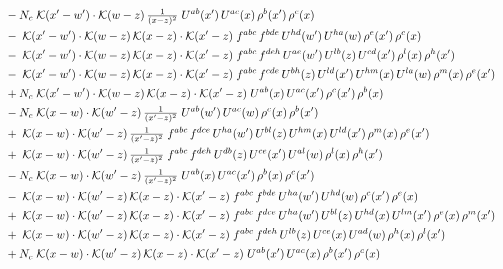 \documentclass[10pt]{article}
\numberwithin{equation}{section}
\begin{document}
\begin{align}
&\quad -N_c\;\mathcal{K}(x'-w')\cdot\mathcal{K}(w-z)\,\tfrac{1}{(x-z)^{2}}\;U^{ab}(x')\,U^{ac}(x)\,\rho^{b}(x')\,\rho^{c}(x)\notag\\
&\quad -\;\mathcal{K}(x'-w')\cdot\mathcal{K}(w-z)\,\mathcal{K}(x-z)\cdot\mathcal{K}(x'-z)\;f^{abc}\,f^{bde}\,U^{hd}(w')\,U^{ha}(w)\,\rho^{e}(x')\,\rho^{c}(x)\notag\\
&\quad -\;\mathcal{K}(x'-w')\cdot\mathcal{K}(w-z)\,\mathcal{K}(x-z)\cdot\mathcal{K}(x'-z)\;f^{abc}\,f^{deh}\,U^{ae}(w')\,U^{lb}(z)\,U^{cd}(x')\,\rho^{l}(x)\,\rho^{h}(x')\notag\\
&\quad -\;\mathcal{K}(x'-w')\cdot\mathcal{K}(w-z)\,\mathcal{K}(x-z)\cdot\mathcal{K}(x'-z)\;f^{abc}\,f^{cde}\,U^{bh}(z)\,U^{ld}(x')\,U^{hm}(x)\,U^{la}(w)\,\rho^{m}(x)\,\rho^{e}(x')\notag\\
&\quad +N_c\;\mathcal{K}(x'-w')\cdot\mathcal{K}(w-z)\,\mathcal{K}(x-z)\cdot\mathcal{K}(x'-z)\;U^{ab}(x)\,U^{ac}(x')\,\rho^{c}(x')\,\rho^{b}(x)\notag\\
&\quad -N_c\;\mathcal{K}(x-w)\cdot\mathcal{K}(w'-z)\,\tfrac{1}{(x'-z)^{2}}\;U^{ab}(w')\,U^{ac}(w)\,\rho^{c}(x)\,\rho^{b}(x')\notag\\
&\quad +\;\mathcal{K}(x-w)\cdot\mathcal{K}(w'-z)\,\tfrac{1}{(x'-z)^{2}}\;f^{abc}\,f^{dce}\,U^{ha}(w')\,U^{bl}(z)\,U^{hm}(x)\,U^{ld}(x')\,\rho^{m}(x)\,\rho^{e}(x')\notag\\
&\quad +\;\mathcal{K}(x-w)\cdot\mathcal{K}(w'-z)\,\tfrac{1}{(x'-z)^{2}}\;f^{abc}\,f^{deh}\,U^{db}(z)\,U^{ce}(x')\,U^{al}(w)\,\rho^{l}(x)\,\rho^{h}(x')\notag\\
&\quad -N_c\;\mathcal{K}(x-w)\cdot\mathcal{K}(w'-z)\,\tfrac{1}{(x'-z)^{2}}\;U^{ab}(x)\,U^{ac}(x')\,\rho^{b}(x)\,\rho^{c}(x')\notag\\
&\quad -\;\mathcal{K}(x-w)\cdot\mathcal{K}(w'-z)\,\mathcal{K}(x-z)\cdot\mathcal{K}(x'-z)\;f^{abc}\,f^{bde}\,U^{ha}(w')\,U^{hd}(w)\,\rho^{c}(x')\,\rho^{e}(x)\notag\\
&\quad +\;\mathcal{K}(x-w)\cdot\mathcal{K}(w'-z)\,\mathcal{K}(x-z)\cdot\mathcal{K}(x'-z)\;f^{abc}\,f^{dce}\,U^{ha}(w')\,U^{bl}(z)\,U^{hd}(x)\,U^{lm}(x')\,\rho^{e}(x)\,\rho^{m}(x')\notag\\
&\quad +\;\mathcal{K}(x-w)\cdot\mathcal{K}(w'-z)\,\mathcal{K}(x-z)\cdot\mathcal{K}(x'-z)\;f^{abc}\,f^{deh}\,U^{lb}(z)\,U^{ce}(x)\,U^{ad}(w)\,\rho^{h}(x)\,\rho^{l}(x')\notag\\
&\quad +N_c\;\mathcal{K}(x-w)\cdot\mathcal{K}(w'-z)\,\mathcal{K}(x-z)\cdot\mathcal{K}(x'-z)\;U^{ab}(x')\,U^{ac}(x)\,\rho^{b}(x')\,\rho^{c}(x)\notag\\

\end{align}
\end{document}

